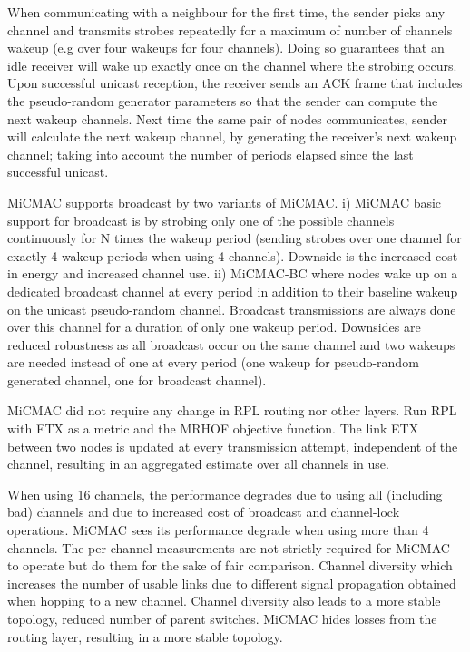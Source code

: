 When communicating with a neighbour for the first time, the sender picks any channel and transmits strobes repeatedly for a maximum of number of channels wakeup (e.g over four wakeups for four channels). Doing so guarantees that an idle receiver will wake up exactly once on the channel where the strobing occurs. Upon successful unicast reception, the receiver sends an ACK frame that includes the pseudo-random generator parameters so that the sender can compute the next wakeup channels. Next time the same pair of nodes communicates, sender will calculate the next wakeup channel, by generating the receiver's next wakeup channel; taking into account the number of periods elapsed since the last successful unicast. 

MiCMAC supports broadcast by two variants of MiCMAC. i) MiCMAC basic support for broadcast is by strobing only one of the possible channels continuously for N times the wakeup period (sending strobes over one channel for exactly 4 wakeup periods when using 4 channels). Downside is the increased cost in energy and increased channel use. ii) MiCMAC-BC where nodes wake up on a dedicated broadcast channel at every period in addition to their baseline wakeup on the unicast pseudo-random channel. Broadcast transmissions are always done over this channel for a duration of only one wakeup period. Downsides are reduced robustness as all broadcast occur on the same channel and two wakeups are needed instead of one at every period (one wakeup for pseudo-random generated channel, one for broadcast channel).

MiCMAC did not require any change in RPL routing nor other layers. Run RPL with ETX as a metric and the MRHOF objective function. The link ETX between two nodes is updated at every transmission attempt, independent of the channel, resulting in an aggregated estimate over all channels in use.

When using 16 channels, the performance degrades due to using all (including bad) channels and due to increased cost of broadcast and channel-lock operations. MiCMAC sees its performance degrade when using more than 4 channels. The per-channel measurements are not strictly required for MiCMAC to operate but do them for the sake of fair comparison. Channel diversity which increases the number of usable links due to different signal propagation obtained when hopping to a new channel. Channel diversity also leads to a more stable topology, reduced number of parent switches. MiCMAC hides losses from the routing layer, resulting in a more stable topology. \cite{micmac}

